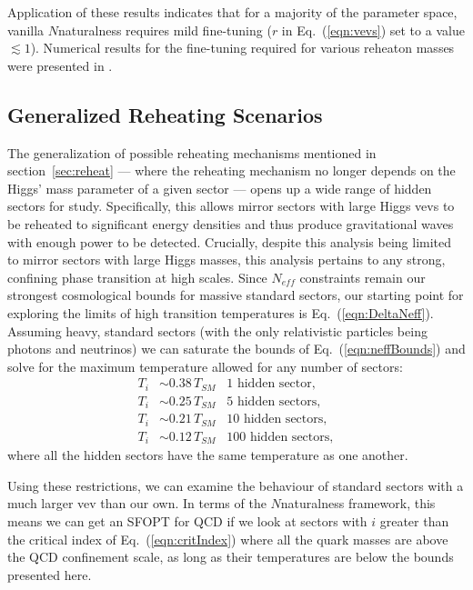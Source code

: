 \documentclass[nofootinbib,twocolumn,preprintnumbers]{revtex4-1}
\begin{document}
Application of these results indicates that for a majority of the parameter space, vanilla $N$naturalness requires mild fine-tuning ($r$ in Eq.~(\ref{eqn:vevs}) set to a value $\lesssim 1$). Numerical results for the fine-tuning required for various reheaton masses were presented in \cite{Arkani-Hamed:2016rle}. 



\subsection{Generalized Reheating Scenarios}\label{sec:genReheat}

The generalization of possible reheating mechanisms mentioned in section~\ref{sec:reheat} --- where the reheating mechanism no longer depends on the Higgs' mass parameter of a given sector --- opens up a wide range of hidden sectors for study. Specifically, this allows mirror sectors with large Higgs vevs to be reheated to significant energy densities and thus produce gravitational waves with enough power to be detected. Crucially, despite this analysis being limited to mirror sectors with large Higgs masses, this analysis pertains to any strong, confining phase transition at high scales.
Since $N_{eff}$ constraints remain our strongest cosmological bounds for massive standard sectors, our starting point for exploring the limits of high transition temperatures is Eq.~(\ref{eqn:DeltaNeff}). Assuming heavy, standard sectors (with the only relativistic particles being photons and neutrinos) we can saturate the bounds of Eq.~(\ref{eqn:neffBounds}) and solve for the maximum temperature allowed for any number of sectors:
\begin{equation}\label{eqn:energyDensityAllowed}
\begin{split}
T_i &\sim 0.38 \,T_{SM} \,\,\,\,\, \mathrm{1}\,\, \mathrm{hidden}\,\, \mathrm{sector},
\\
T_i &\sim 0.25 \,T_{SM} \,\,\,\,\, \mathrm{5} \,\,\mathrm{hidden}\,\, \mathrm{sectors},
\\
T_i &\sim 0.21 \,T_{SM} \,\,\,\,\, \mathrm{10} \,\,\mathrm{hidden}\,\, \mathrm{sectors},
\\
T_i &\sim 0.12 \,T_{SM} \,\,\,\,\, \mathrm{100} \,\,\mathrm{hidden}\,\, \mathrm{sectors},
\end{split}
\end{equation}
where all the hidden sectors have the same temperature as one another.

Using these restrictions, we can examine the behaviour of standard sectors with a much larger vev than our own. In terms of the $N$naturalness framework, this means we can get an SFOPT for QCD if we look at sectors with $i$ greater than the critical index of Eq.~(\ref{eqn:critIndex}) where all the quark masses are above the QCD confinement scale, as long as their temperatures are below the bounds presented here. 
\end{document}
